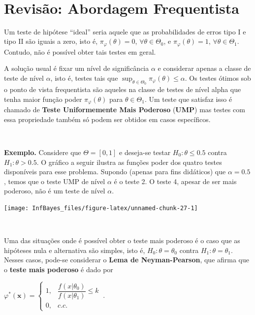 \documentclass[
]{book}
\begin{document}
\(~\)

\hypertarget{revisuxe3o-abordagem-frequentista}{%
\section{Revisão: Abordagem Frequentista}\label{revisuxe3o-abordagem-frequentista}}

Um teste de hipótese ``ideal'' seria aquele que as probabilidades de erros tipo I e tipo II são iguais a zero, isto é, \(\pi_\varphi(\theta)=0\), \(\forall \theta \in \Theta_0\), e \(\pi_\varphi(\theta)=1\), \(\forall \theta \in \Theta_1\). Contudo, não é possível obter tais testes em geral.

A solução usual é fixar um nível de significância \(\alpha\) e considerar apenas a classe de teste de nível \(\alpha\), isto é, testes tais que \(\displaystyle\sup_{\theta\in\Theta_0}\pi_\varphi(\theta) \leq \alpha\). Os testes ótimos sob o ponto de vista frequentista são aqueles na classe de testes de nível alpha que tenha maior função poder \({\pi}_\varphi(\theta)\) para \(\theta \in \Theta_1\). Um teste que satisfaz isso é chamado de \textbf{Teste Uniformemente Mais Poderoso} (\textbf{UMP}) mas testes com essa propriedade também só podem ser obtidos em casos específicos.

\(~\)

\textbf{Exemplo.} Considere que \(\Theta=[0,1]\) e deseja-se testar \(H_0: \theta \leq 0.5\) contra \(H_1: \theta > 0.5\). O gráfico a seguir ilustra as funções poder dos quatro testes disponíveis para esse problema. Supondo (apenas para fins didáticos) que \(\alpha=0.5\), temos que o teste UMP de nível \(\alpha\) é o teste 2. O teste 4, apesar de ser mais poderoso, não é um teste de nível \(\alpha\).

\begin{center}\texttt{[image: InfBayes\_files/figure-latex/unnamed-chunk-27-1]} \end{center}

\(~\)

Uma das situações onde é possível obter o teste mais poderoso é o caso que as hipóteses nula e alternativa são simples, isto é, \(H_0:\theta=\theta_0\) contra \(H_1:\theta=\theta_1\). Nesses casos, pode-se considerar o \textbf{Lema de Neyman-Pearson}, que afirma que o \textbf{teste mais poderoso} é dado por

\({\varphi}^*(\boldsymbol x)=\left\{\begin{array}{rl} 1,& \dfrac{f(x|\theta_0)}{f(x|\theta_1)}\leq k\\ 0,& c.c.\end{array}\right.~.\)
\end{document}
